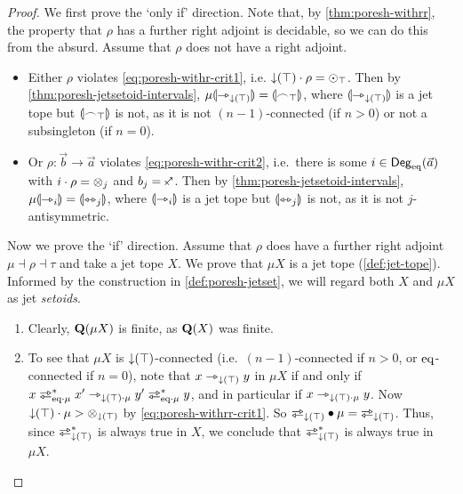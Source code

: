 \documentclass[a4paper]{memoir}
\begin{document}
\begin{proof}
	We first prove the `only if' direction.
	Note that, by \cref{thm:poresh-withrr}, the property that $\rho$ has a further right adjoint is decidable, so we can do this from the absurd.
	Assume that $\rho$ does not have a right adjoint.
	\begin{itemize}
		\item Either $\rho$ violates \cref{eq:poresh-withr-crit1}, i.e. ${\downarrow}(\top) \cdot \rho = {\odot}_\top$.
		Then by \cref{thm:poresh-jetsetoid-intervals}, $\mu {\llparenthesis {\rightarrowtriangle}_{{\downarrow}(\top)} \rrparenthesis} = {\llparenthesis {\frown}_\top \rrparenthesis}$, where ${\llparenthesis {\rightarrowtriangle}_{{\downarrow}(\top)} \rrparenthesis}$ is a jet tope but ${\llparenthesis {\frown}_\top \rrparenthesis}$ is not, as it is not $(n-1)$-connected (if $n > 0$) or not a subsingleton (if $n = 0$).
		\item Or $\rho : \vec b \to \vec a$ violates \cref{eq:poresh-withr-crit2}, i.e.\ there is some $i \in {\mathsf{Deg}_{\mathrm{eq}}}(\vec a)$ with $i \cdot \rho = {\otimes}_j$ and $b_j = \ypolar$.
		Then by \cref{thm:poresh-jetsetoid-intervals}, $\mu {\llparenthesis {\rightarrowtriangle}_i \rrparenthesis} = {\llparenthesis {\leftrightarrowtriangle}_j \rrparenthesis}$, where ${\llparenthesis {\rightarrowtriangle}_i \rrparenthesis}$ is a jet tope but ${\llparenthesis {\leftrightarrowtriangle}_j \rrparenthesis}$ is not, as it is not $j$-antisymmetric.
	\end{itemize}
	
	Now we prove the `if' direction.
	Assume that $\rho$ does have a further right adjoint $\mu \dashv \rho \dashv \tau$ and take a jet tope $X$.
	We prove that $\mu X$ is a jet tope (\cref{def:jet-tope}).
	Informed by the construction in \cref{def:poresh-jetset}, we will regard both $X$ and $\mu X$ as jet \emph{setoids}.
	\begin{enumerate}
		\item Clearly, ${\mathbf{Q}}(\mu X)$ is finite, as ${\mathbf{Q}}(X)$ was finite.
		
		\item To see that $\mu X$ is ${\downarrow}(\top)$-connected (i.e.\ $(n-1)$-connected if $n > 0$, or ${\mathrm{eq}}$-connected if $n = 0$), note that $x \rightarrowtriangle_{{\downarrow}(\top)} y$ in $\mu X$ if and only if $x \infrajet_{\eqtydeg \cdot \mu}^* x' \jet_{\predeg(\top) \cdot \mu} y' \infrajet_{\eqtydeg \cdot \mu}^* y$, and in particular if $x \rightarrowtriangle_{{\downarrow}(\top) \cdot \mu} y$.
		Now ${\downarrow}(\top) \cdot \mu > {\otimes}_{{\downarrow}(\top)}$ by \cref{eq:poresh-withrr-crit1}.
		So $\infrajetsym_{\predeg(\top)} \oriof \mu = \infrajetsym_{\predeg(\top)}$.
		Thus, since $\infrajetsym_{\predeg(\top)}^*$ is always true in $X$, we conclude that $\infrajetsym_{\predeg(\top)}^*$ is always true in $\mu X$.
		

\end{enumerate}
\end{proof}
\end{document}
